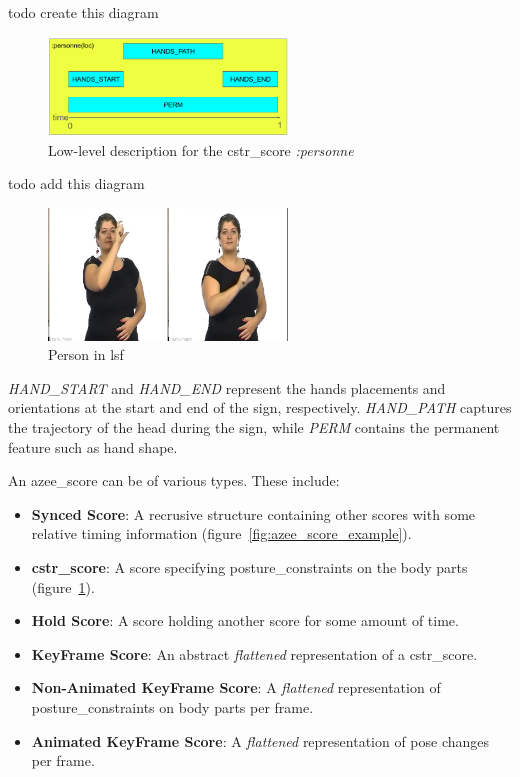 \documentclass[../../main.tex]{subfiles}
\begin{document}
todo create this diagram
\begin{figure}
  \centering \includegraphics[width = 2.5in]{chapters/background_work/images/azee_score_person.png}
  \caption{Low-level description for the \gls{cstr_score} \emph{:personne}}
  \label{fig:azee_score_person}
\end{figure}

todo add this diagram
\begin{figure}
  \centering \includegraphics[width = 2.5in]{chapters/background_work/images/person_lsf.png}
  \caption{Person in \gls{lsf}}
  \label{fig:person_lsf}
\end{figure}

\emph{HAND\_START} and \emph{HAND\_END} represent the hands placements and orientations at the start and end of the sign, respectively. \emph{HAND\_PATH} captures the trajectory of the head during the sign, while \emph{PERM} contains the permanent feature such as hand shape.

An \gls{azee_score} can be of various types. These include:

\begin{itemize}
  \item \textbf{Synced Score}: A recrusive structure containing other scores with some relative timing information (figure~\ref{fig:azee_score_example}).
  \item \textbf{\gls{cstr_score}}: A score specifying \gls{posture_constraint}s on the body parts (figure~\ref{fig:azee_score_person}).
  \item \textbf{Hold Score}: A score holding another score for some amount of time.
  \item \textbf{KeyFrame Score}: An abstract \emph{flattened} representation of a \gls{cstr_score}.
  \item \textbf{Non-Animated KeyFrame Score}: A \emph{flattened} representation of \gls{posture_constraint}s on body parts per frame.
  \item \textbf{Animated KeyFrame Score}: A \emph{flattened} representation of pose changes per frame.
\end{itemize}
\end{document}
